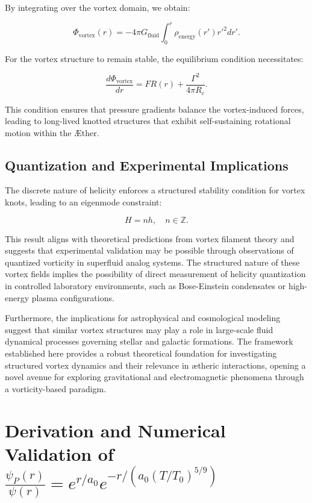 \documentclass[a4paper,10pt]{article}
\begin{document}
By integrating over the vortex domain, we obtain:

\begin{equation*}
\Phi_\text{vortex}(r) = -4\pi G_\text{fluid} \int_0^r \rho_\text{energy}(r') r'^2 dr'.
\end{equation*}

For the vortex structure to remain stable, the equilibrium condition necessitates:

\begin{equation*}
\frac{d\Phi_\text{vortex}}{dr} = F R(r) + \frac{\Gamma^2}{4 \pi R_c}.
\end{equation*}

This condition ensures that pressure gradients balance the vortex-induced forces, leading to long-lived knotted structures that exhibit self-sustaining rotational motion within the Æther.

\subsection{Quantization and Experimental Implications}
The discrete nature of helicity enforces a structured stability condition for vortex knots, leading to an eigenmode constraint:

\begin{equation*}
H = n h, \quad n \in \mathbb{Z}.
\end{equation*}

This result aligns with theoretical predictions from vortex filament theory and suggests that experimental validation may be possible through observations of quantized vorticity in superfluid analog systems. The structured nature of these vortex fields implies the possibility of direct measurement of helicity quantization in controlled laboratory environments, such as Bose-Einstein condensates or high-energy plasma configurations.

Furthermore, the implications for astrophysical and cosmological modeling suggest that similar vortex structures may play a role in large-scale fluid dynamical processes governing stellar and galactic formations. The framework established here provides a robust theoretical foundation for investigating structured vortex dynamics and their relevance in ætheric interactions, opening a novel avenue for exploring gravitational and electromagnetic phenomena through a vorticity-based paradigm.

    
  \section{Derivation and Numerical Validation of $\frac{\psi_P(r)}{\psi(r)} = e^{r/a_0} e^{-r / (a_0 (T/T_0)^{5/9})}$}
\end{document}
